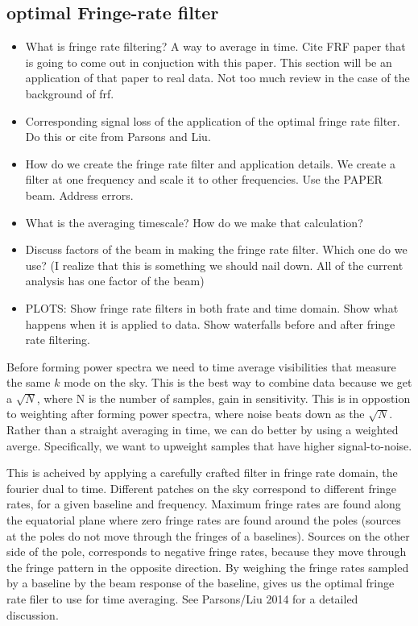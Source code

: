 \documentclass[twocolumn,numberedappendix]{emulateapj}
\begin{document}
{\subsection{optimal Fringe-rate filter}
\begin{itemize}
    \item{What is fringe rate filtering? A way to average in time. Cite FRF
paper that is going to come out in conjuction with this paper. This section will
be an application of that paper to real data. Not too much review in the case of
the background of frf.}
    \item{Corresponding signal loss of the application of the optimal fringe
rate filter. Do this or cite from Parsons and Liu.} 
    \item{How do we create the fringe rate filter and application details. We
create a filter at one frequency and scale it to other frequencies. Use the
PAPER beam. Address errors.}
    \item{What is the averaging timescale? How do we make that calculation?}
    \item{Discuss factors of the beam in making the fringe rate filter. Which
one do we use? (I realize that this is something we should nail down. All of the
current analysis has one factor of the beam)}
    \item{PLOTS: Show fringe rate filters in both frate and time domain. Show
what happens when it is applied to data. Show waterfalls before and after fringe
rate filtering.}
\end{itemize}
Before forming power spectra we need to time average visibilities that measure
the same $k$ mode on the sky. This is the best way to combine data because we
get a $\sqrt{N}$, where N is the number of samples, gain in sensitivity. This is
in oppostion to weighting after forming power spectra, where noise beats down as
the $\sqrt{N}$. Rather than a straight averaging in time, we can do better by
using a weighted averge. Specifically, we want to upweight samples that have
higher signal-to-noise. 

This is acheived by applying a carefully crafted filter in fringe rate domain,
the fourier dual to time. Different patches on the sky correspond to different
fringe rates, for a given baseline and frequency. Maximum fringe rates are found
along the equatorial plane where zero fringe rates are found around the poles
(sources at the poles do not move through the fringes of a baselines). Sources
on the other side of the pole, corresponds to negative fringe rates, because
they move through the fringe pattern in the opposite direction. By weighing the
fringe rates sampled by a baseline by the beam response of the baseline, gives
us the optimal fringe rate filer to use for time averaging. See Parsons/Liu 2014
for a detailed discussion.

}
\end{document}
